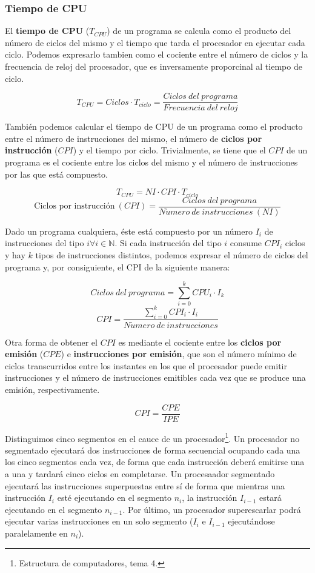 \subsubsection{Tiempo de CPU}

El \textbf{tiempo de CPU} ($T_{CPU}$) de un programa se calcula como el producto del número de ciclos del mismo y el tiempo que tarda el procesador en ejecutar cada ciclo.
Podemos expresarlo tambien como el cociente entre el número de ciclos y la frecuencia de reloj del procesador, que es inversamente proporcinal al tiempo de ciclo.

\[T_{CPU}=Ciclos\cdot T_{ciclo}=\frac{Ciclos\ del\ programa}{Frecuencia\ del\ reloj}\]

También podemos calcular el tiempo de CPU de un programa como el producto entre el número de instrucciones del mismo, el número de \textbf{ciclos por instrucción} ($CPI$) y el tiempo por ciclo.
Trivialmente, se tiene que el $CPI$ de un programa es el cociente entre los ciclos del mismo y el número de instrucciones por las que está compuesto.

\[T_{CPU}=NI\cdot CPI\cdot T_{ciclo}\]
\[\text{Ciclos por instrucción}\ (CPI)=\frac{Ciclos\ del\ programa}{N\acute{u}mero\ de\ instrucciones\ (NI)}\]

Dado un programa cualquiera, éste está compuesto por un número $I_i$ de instrucciones del tipo $i\forall i\in\mathbb{N}$.
Si cada instrucción del tipo $i$ consume $CPI_i$ ciclos y hay $k$ tipos de instrucciones distintos, podemos expresar el número de ciclos del programa y, por consiguiente, el CPI de la siguiente manera:

\[Ciclos\ del\ programa=\sum_{i=0}^{k}CPU_i\cdot I_k\]
\[CPI=\frac{\sum_{i=0}^{k}CPI_i\cdot I_i}{N\acute{u}mero\ de\ instrucciones}\]

Otra forma de obtener el $CPI$ es mediante el cociente entre los \textbf{ciclos por emisión} ($CPE$) e \textbf{instrucciones por emisión}, que son el número mínimo de ciclos transcurridos entre los instantes en los que el procesador puede emitir instrucciones y el número de instrucciones emitibles cada vez que se produce una emisión, respectivamente.

\[CPI=\frac{CPE}{IPE}\]

Distinguimos cinco segmentos en el cauce de un procesador\footnote{Estructura de computadores, tema 4.}.
Un procesador no segmentado ejecutará dos instrucciones de forma secuencial ocupando cada una los cinco segmentos cada vez, de forma que cada instrucción deberá emitirse una a una y tardará cinco ciclos en completarse.
Un procesaador segmentado ejecutará las instrucciones superpuestas entre sí de forma que mientras una instrucción $I_i$ esté ejecutando en el segmento $n_i$, la instrucción $I_{i-1}$ estará ejecutando en el segmento $n_{i-1}$.
Por último, un procesador superescarlar podrá ejecutar varias instrucciones en un solo segmento ($I_i$ e $I_{i-1}$ ejecutándose paralelamente en $n_i$).

